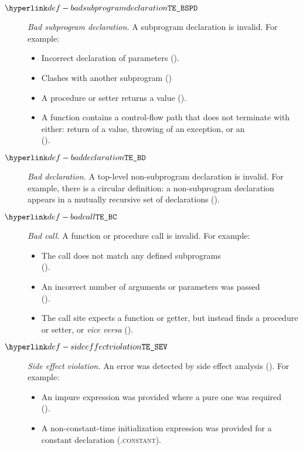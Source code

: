 \begin{description}
\hypertarget{def-badsubprogramdeclaration}{}
\item[$\BadSubprogramDeclaration$]
  \textit{Bad subprogram declaration.}
  A subprogram declaration is invalid.
  For example:
  \begin{itemize}
    \item Incorrect declaration of parameters ().
    \item Clashes with another subprogram ()
    \item A procedure or setter returns a value ().
    \item A function contains a control-flow path that does not terminate with either:
          return of a value, throwing of an exception, or an \unreachablestatementterm{} \\
      ().
  \end{itemize}

\hypertarget{def-baddeclaration}{}
\item[$\BadDeclaration$]
  \textit{Bad declaration.}
  A top-level non-subprogram declaration is invalid.
  For example, there is a circular definition: a non-subprogram declaration appears in a mutually recursive set of declarations ().

\hypertarget{def-badcall}{}
\item[$\BadCall$]
  \textit{Bad call.}
  A function or procedure call is invalid.
  For example:
  \begin{itemize}
    \item The call does not match any defined subprograms \\
          ().
    \item An incorrect number of arguments or parameters was passed \\
      ().
    \item The call site expects a function or getter, but instead finds a procedure or setter, or \textit{vice versa} ().
  \end{itemize}

\hypertarget{def-sideeffectviolation}{}
\item[$\SideEffectViolation$]
  \textit{Side effect violation.}
  An error was detected by side effect analysis ().
  For example:
  \begin{itemize}
    \item An impure expression was provided where a pure one was required \\
      ().
    \item A non-constant-time initialization expression was provided for a constant declaration (.\textsc{constant}).
  \end{itemize}


\end{description}
